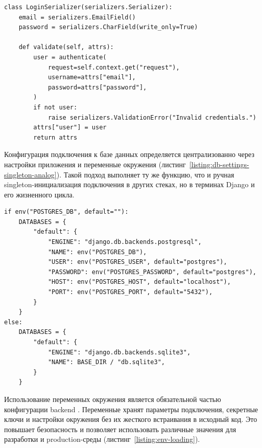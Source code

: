 \begin{listing}[H]
\caption{Проверка учетных данных пользователя при входе}
\label{listing:user-auth-lookup}
\begin{mdframed}
\begin{verbatim}
class LoginSerializer(serializers.Serializer):
    email = serializers.EmailField()
    password = serializers.CharField(write_only=True)

    def validate(self, attrs):
        user = authenticate(
            request=self.context.get("request"),
            username=attrs["email"],
            password=attrs["password"],
        )
        if not user:
            raise serializers.ValidationError("Invalid credentials.")
        attrs["user"] = user
        return attrs
\end{verbatim}
\end{mdframed}
\end{listing}

Конфигурация подключения к базе данных определяется централизованно через настройки приложения и переменные окружения (листинг~\ref{listing:db-settings-singleton-analog}). Такой подход выполняет ту же функцию, что и ручная singleton-инициализация подключения в других стеках, но в терминах Django и его жизненного цикла.

\begin{listing}[H]
\caption{Конфигурация подключения к PostgreSQL в Django}
\label{listing:db-settings-singleton-analog}
\begin{mdframed}
\begin{verbatim}
if env("POSTGRES_DB", default=""):
    DATABASES = {
        "default": {
            "ENGINE": "django.db.backends.postgresql",
            "NAME": env("POSTGRES_DB"),
            "USER": env("POSTGRES_USER", default="postgres"),
            "PASSWORD": env("POSTGRES_PASSWORD", default="postgres"),
            "HOST": env("POSTGRES_HOST", default="localhost"),
            "PORT": env("POSTGRES_PORT", default="5432"),
        }
    }
else:
    DATABASES = {
        "default": {
            "ENGINE": "django.db.backends.sqlite3",
            "NAME": BASE_DIR / "db.sqlite3",
        }
    }
\end{verbatim}
\end{mdframed}
\end{listing}

Использование переменных окружения является обязательной частью конфигурации backend \cite{django_environ_docs_2026}. Переменные хранят параметры подключения, секретные ключи и настройки окружения без их жесткого встраивания в исходный код. Это повышает безопасность и позволяет использовать различные значения для разработки и production-среды (листинг~\ref{listing:env-loading}).

